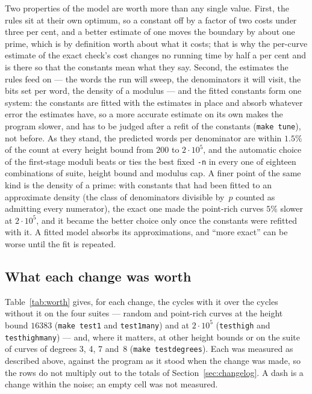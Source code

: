 \documentclass[12pt,a4paper,oneside]{amsart}
\begin{document}
Two properties of the model are worth more than any single value. First,
the rules sit at their own optimum, so a constant off by a factor of two
costs under three per cent, and a better estimate of one moves the boundary
by about one prime, which is by definition worth about what it costs; that
is why the per-curve estimate of the exact check's cost changes no running
time by half a per cent and is there so that the constants mean what they
say. Second, the estimates the rules feed on --- the words the run will
sweep, the denominators it will visit, the bits set per word, the density
of a modulus --- and the fitted constants form one system: the constants are
fitted with the estimates in place and absorb whatever error the estimates
have, so a more accurate estimate on its own makes the program slower, and
has to be judged after a refit of the constants (\texttt{make tune}), not
before. As they stand, the predicted words per denominator are within
$1.5\%$ of the count at every height bound from $200$ to $2\cdot10^5$, and
the automatic choice of the first-stage moduli beats or ties the best fixed
\verb+-n+ in every one of eighteen combinations of suite, height bound and
modulus cap. A finer point of the same kind is the density of a prime: with
constants that had been fitted to an approximate density (the class of
denominators divisible by~$p$ counted as admitting every numerator), the
exact one made the point-rich curves $5\%$ slower at $2\cdot10^5$, and it
became the better choice only once the constants were refitted with it. A
fitted model absorbs its approximations, and ``more exact'' can be worse
until the fit is repeated.

\subsection{What each change was worth}\label{app:worth}

Table~\ref{tab:worth} gives, for each change, the cycles with it over the
cycles without it on the four suites --- random and point-rich curves at
the height bound $16383$ (\texttt{make test1} and \texttt{test1many}) and at
$2\cdot10^5$ (\texttt{testhigh} and \texttt{testhighmany}) --- and, where it
matters, at other height bounds or on the suite of curves of degrees 3, 4,
7 and~8 (\texttt{make testdegrees}). Each was measured as described above,
against the program as it stood when the change was made, so the rows do
not multiply out to the totals of Section~\ref{sec:changelog}. A dash is a
change within the noise; an empty cell was not measured.
\end{document}
